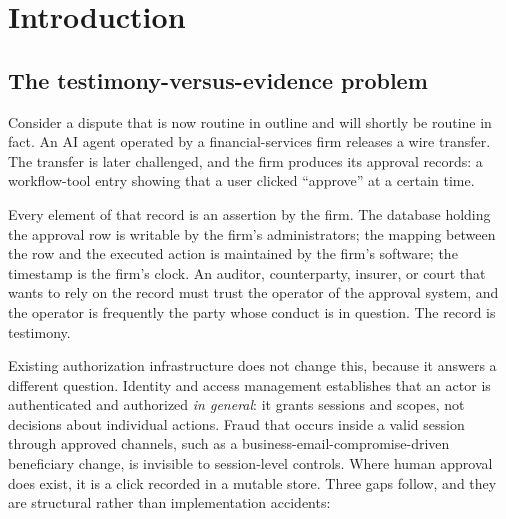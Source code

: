 \documentclass[11pt]{article}
\begin{document}
\begin{abstract}
the exclusions exactly: WebAuthn internals, canonical parsers, policy authorship
and amount arithmetic, clock freshness, transparency-log completeness, collusion,
and downstream exactly-once effects are not proven by the symbolic model. Around
this analyzed core we describe a host-agnostic binding profile and a
purpose-relative evidence-sufficiency layer with deterministic, replayable
verdicts. Verification establishes signature, binding, and log-inclusion
integrity as of commit time; it never establishes that the authorized action was
correct, and we bound the residual risks, including presentation attacks, that
cryptography narrows but does not remove.
\end{abstract}

\section{Introduction}

\subsection{The testimony-versus-evidence problem}

Consider a dispute that is now routine in outline and will shortly be routine in
fact. An AI agent operated by a financial-services firm releases a wire transfer.
The transfer is later challenged, and the firm produces its approval records: a
workflow-tool entry showing that a user clicked ``approve'' at a certain time.

Every element of that record is an assertion by the firm. The database holding
the approval row is writable by the firm's administrators; the mapping between
the row and the executed action is maintained by the firm's software; the
timestamp is the firm's clock. An auditor, counterparty, insurer, or court that
wants to rely on the record must trust the operator of the approval system, and
the operator is frequently the party whose conduct is in question. The record is
testimony.

Existing authorization infrastructure does not change this, because it answers a
different question. Identity and access management establishes that an actor is
authenticated and authorized \emph{in general}: it grants sessions and scopes,
not decisions about individual actions. Fraud that occurs inside a valid session
through approved channels, such as a business-email-compromise-driven beneficiary
change, is invisible to session-level controls. Where human approval does exist,
it is a click recorded in a mutable store. Three gaps follow, and they are
structural rather than implementation accidents:
\end{document}
